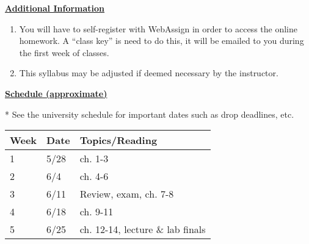 \documentclass[12pt]{article}
\begin{document}
\underline{\textbf{Additional Information}} \par
\begin{enumerate}
\item You will have to self-register with WebAssign in order to access the online homework.
A “class key” is need to do this, it will be emailed to you during the first week of classes.
\item This syllabus may be adjusted if deemed necessary by the instructor.
\end{enumerate}

\pagebreak

\underline{\textbf{Schedule (approximate)}} \par
* See the university schedule for important dates such as drop deadlines, etc.
\begin{longtable}{| p{} | p{} | p{} |}
\hline
Week & Date & Topics/Reading \\ \hline
1 & 5/28 & ch. 1-3 \\ \hline
2 & 6/4 & ch. 4-6 \\ \hline
3 & 6/11 & Review, exam, ch. 7-8 \\ \hline
4 & 6/18 & ch. 9-11 \\ \hline
5 & 6/25 & ch. 12-14, lecture \& lab finals \\ \hline
\end{longtable}
\end{document}
